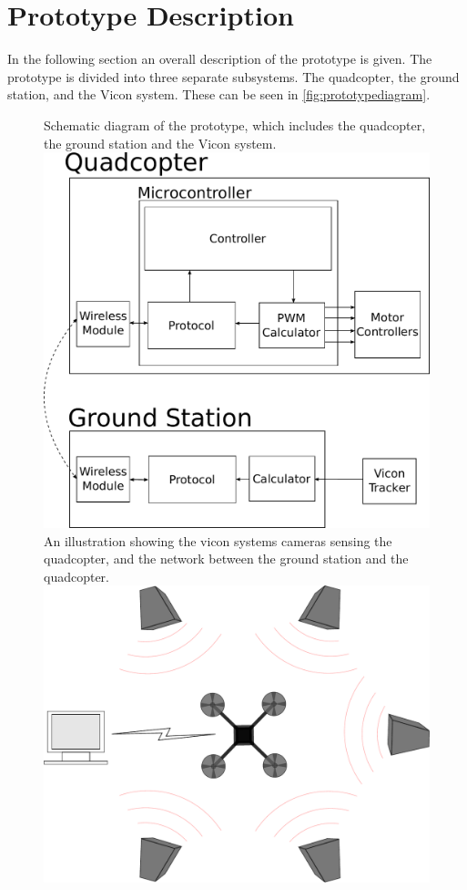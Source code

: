 \section{Prototype Description}\label{sec:PrototypeDescription}
In the following section an overall description of the prototype is given. %
The prototype is divided into three separate subsystems. The quadcopter, the ground station, and the Vicon system. These can be seen in \autoref{fig:prototypediagram}. 

\begin{figure}[H]
  \centering
  \captionbox
  {
    Schematic diagram of the prototype, which includes the quadcopter, the ground station and the Vicon system.
    \label{fig:prototypediagram}
  }
  {
    \includegraphics[width=.5\textwidth]{figures/prototypediagram}
  }
  \hspace{5pt}
  \captionbox
  {
   An illustration showing the vicon systems cameras sensing the quadcopter, and the network between the ground station and the quadcopter.
    \label{fig:Vicontotalsystem}
  }
  {
    \includegraphics[width=.40\textwidth]{figures/system.pdf}
  }
\end{figure}

